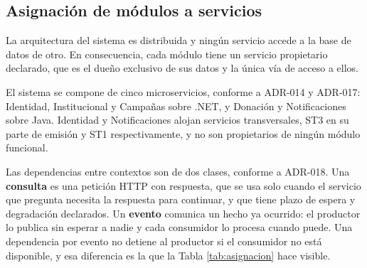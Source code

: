 \documentclass[11pt,a4paper]{article}
\begin{document}
\subsection{Asignación de módulos a servicios}

La arquitectura del sistema es distribuida y ningún servicio accede a la base de datos de otro. En consecuencia, cada módulo tiene un servicio propietario declarado, que es el dueño exclusivo de sus datos y la única vía de acceso a ellos.

El sistema se compone de cinco microservicios, conforme a ADR-014 y ADR-017: Identidad, Institucional y Campañas sobre .NET, y Donación y Notificaciones sobre Java. Identidad y Notificaciones alojan servicios transversales, ST3 en su parte de emisión y ST1 respectivamente, y no son propietarios de ningún módulo funcional.

Las dependencias entre contextos son de dos clases, conforme a ADR-018. Una \textbf{consulta} es una petición HTTP con respuesta, que se usa solo cuando el servicio que pregunta necesita la respuesta para continuar, y que tiene plazo de espera y degradación declarados. Un \textbf{evento} comunica un hecho ya ocurrido: el productor lo publica sin esperar a nadie y cada consumidor lo procesa cuando puede. Una dependencia por evento no detiene al productor si el consumidor no está disponible, y esa diferencia es la que la Tabla \ref{tab:asignacion} hace visible.
\end{document}
